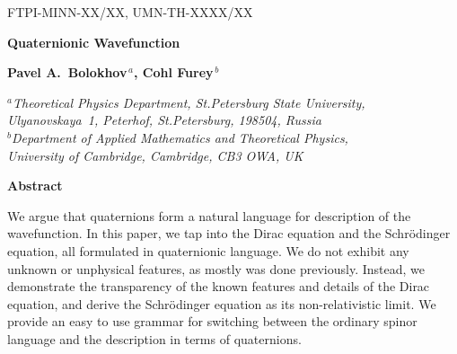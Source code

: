 \documentclass[epsfig,12pt]{article}
\begin{document}
\begin{titlepage}


\begin{flushright}
FTPI-MINN-XX/XX, UMN-TH-XXXX/XX\\
\end{flushright}

\vskip 2cm
\begin{center}
{  \Large \bf  Quaternionic Wavefunction }
\end{center}
\vskip 0.5cm

\begin{center}

 {\large
 \bf   Pavel A.~Bolokhov$^{\,a}$,  Cohl Furey$^{\,b}$
 }
\end {center}

\begin{center}
$^a${\it Theoretical Physics Department, St.Petersburg State University, Ulyanovskaya~1, 
	Peterhof, St.Petersburg, 198504, Russia}\\
$^b${\it Department of Applied Mathematics and Theoretical Physics,\\
	University of Cambridge, Cambridge, CB3 OWA, UK}
\end{center}




\begin{center}
{\large\bf Abstract}
\end{center}

\hspace{0.3cm}
	We argue that quaternions form a natural language for description of the wavefunction.
	In this paper, we tap into the Dirac equation and the Schr\"odinger equation, all
	formulated in quaternionic language.
	We do not exhibit any unknown or unphysical features, as mostly was done previously.
	Instead, we demonstrate the transparency of the known features and details of the Dirac equation,
	and derive the Schr\"odinger equation as its non-relativistic limit. 
	We provide an easy to use grammar for switching between the ordinary spinor language
	and the description in terms of quaternions.
\vspace{2cm}


\end{titlepage}
\end{document}

